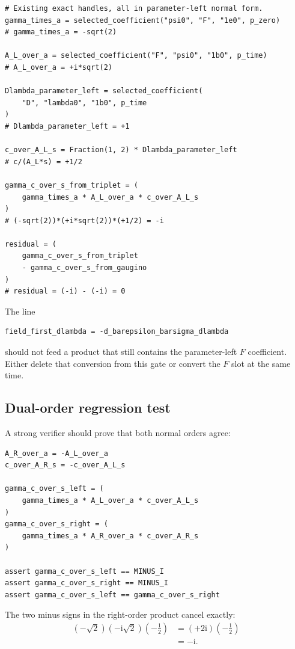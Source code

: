 \documentclass[11pt,a4paper,UTF8]{ctexart}
\numberwithin{equation}{section}
\newcommand{\ii}{\mathrm i}
\begin{document}
\begin{lstlisting}[style=pythonstyle,caption={Parameter-left coefficient extraction for the repaired gate}]
# Existing exact handles, all in parameter-left normal form.
gamma_times_a = selected_coefficient("psi0", "F", "1e0", p_zero)
# gamma_times_a = -sqrt(2)

A_L_over_a = selected_coefficient("F", "psi0", "1b0", p_time)
# A_L_over_a = +i*sqrt(2)

Dlambda_parameter_left = selected_coefficient(
    "D", "lambda0", "1b0", p_time
)
# Dlambda_parameter_left = +1

c_over_A_L_s = Fraction(1, 2) * Dlambda_parameter_left
# c/(A_L*s) = +1/2

gamma_c_over_s_from_triplet = (
    gamma_times_a * A_L_over_a * c_over_A_L_s
)
# (-sqrt(2))*(+i*sqrt(2))*(+1/2) = -i

residual = (
    gamma_c_over_s_from_triplet
    - gamma_c_over_s_from_gaugino
)
# residual = (-i) - (-i) = 0
\end{lstlisting}

The line
\begin{lstlisting}[style=pythonstyle]
field_first_dlambda = -d_barepsilon_barsigma_dlambda
\end{lstlisting}
should not feed a product that still contains the parameter-left $F$ coefficient. Either delete that conversion from this gate or convert the $F$ slot at the same time.

\subsection{Dual-order regression test}

A strong verifier should prove that both normal orders agree:
\begin{lstlisting}[style=pythonstyle,caption={Order-covariance regression test}]
A_R_over_a = -A_L_over_a
c_over_A_R_s = -c_over_A_L_s

gamma_c_over_s_left = (
    gamma_times_a * A_L_over_a * c_over_A_L_s
)
gamma_c_over_s_right = (
    gamma_times_a * A_R_over_a * c_over_A_R_s
)

assert gamma_c_over_s_left == MINUS_I
assert gamma_c_over_s_right == MINUS_I
assert gamma_c_over_s_left == gamma_c_over_s_right
\end{lstlisting}
The two minus signs in the right-order product cancel exactly:
\begin{align}
(-\sqrt2)(-\ii\sqrt2)\left(-\frac12\right)
&=(+2\ii)\left(-\frac12\right)
\\
&=-\ii.
\end{align}
\end{document}
